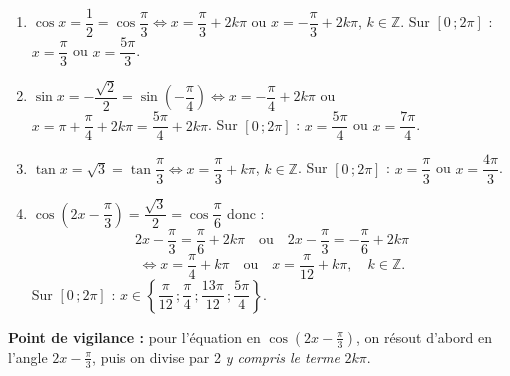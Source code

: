 \documentclass[11pt]{article}
\begin{document}
\begin{corrige}
\begin{enumerate}
\item $\cos x = \dfrac{1}{2} = \cos\dfrac{\pi}{3} \iff x = \dfrac{\pi}{3} + 2k\pi$ ou $x = -\dfrac{\pi}{3} + 2k\pi$, $k\in\mathbb{Z}$. Sur $[0\,;2\pi]$ : $x = \dfrac{\pi}{3}$ ou $x = \dfrac{5\pi}{3}$.
\item $\sin x = -\dfrac{\sqrt{2}}{2} = \sin\left(-\dfrac{\pi}{4}\right) \iff x = -\dfrac{\pi}{4} + 2k\pi$ ou $x = \pi + \dfrac{\pi}{4} + 2k\pi = \dfrac{5\pi}{4} + 2k\pi$. Sur $[0\,;2\pi]$ : $x = \dfrac{5\pi}{4}$ ou $x = \dfrac{7\pi}{4}$.
\item $\tan x = \sqrt{3} = \tan\dfrac{\pi}{3} \iff x = \dfrac{\pi}{3} + k\pi$, $k\in\mathbb{Z}$. Sur $[0\,;2\pi]$ : $x = \dfrac{\pi}{3}$ ou $x = \dfrac{4\pi}{3}$.
\item $\cos\left(2x - \dfrac{\pi}{3}\right) = \dfrac{\sqrt{3}}{2} = \cos\dfrac{\pi}{6}$ donc :
\[ 2x - \frac{\pi}{3} = \frac{\pi}{6} + 2k\pi \quad\text{ou}\quad 2x - \frac{\pi}{3} = -\frac{\pi}{6} + 2k\pi \]
\[ \iff x = \frac{\pi}{4} + k\pi \quad\text{ou}\quad x = \frac{\pi}{12} + k\pi, \quad k\in\mathbb{Z}. \]
Sur $[0\,;2\pi]$ : $x \in \left\{\dfrac{\pi}{12}\,;\dfrac{\pi}{4}\,;\dfrac{13\pi}{12}\,;\dfrac{5\pi}{4}\right\}$.
\end{enumerate}
\textbf{Point de vigilance :} pour l'équation en $\cos(2x-\frac{\pi}{3})$, on résout d'abord en l'angle $2x-\frac{\pi}{3}$, puis on divise par 2 \emph{y compris le terme} $2k\pi$.
\end{corrige}
\end{document}
